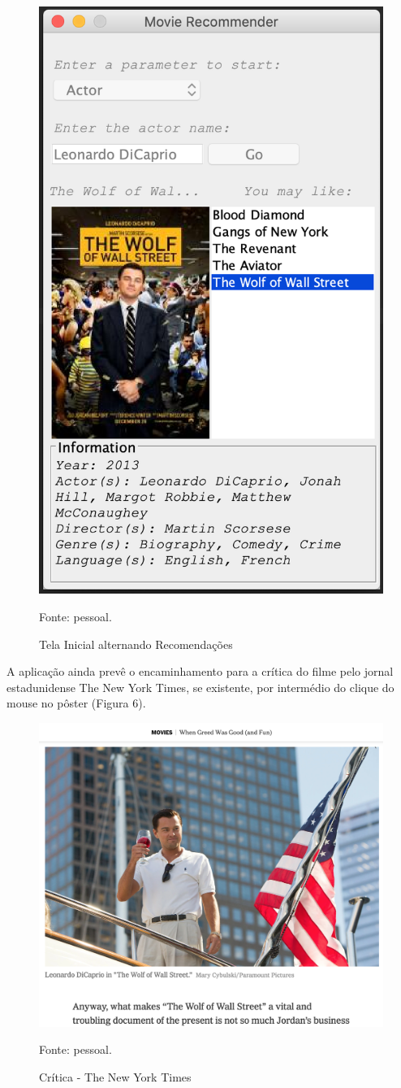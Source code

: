    \begin{figure}[H]
	\centering
	\includegraphics[width=0.5\linewidth]{images/telaInicialRecomendacao2}
	\caption{Tela Inicial alternando Recomendações}
	Fonte: pessoal.
	\label{fig:Tela Inicial alternando Recomendações}
\end{figure}
 
 A aplicação ainda prevê o encaminhamento para a crítica do filme pelo jornal estadunidense The New York Times, se existente, por intermédio do clique do mouse no pôster (Figura 6).
 
   \begin{figure}[H]
	\centering
	\includegraphics[width=0.6\linewidth]{images/NYTIMES}
	\caption{Crítica - The New York Times}
	Fonte: pessoal.
	\label{fig:Crítica - The New York Times}
\end{figure}

